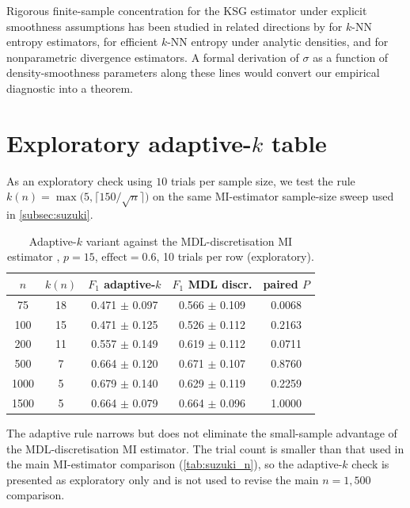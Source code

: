 Rigorous finite-sample concentration for the KSG estimator under
explicit smoothness assumptions has been studied in related
directions by \citet{singh2014exponential} for $k$-NN entropy
estimators, \citet{berrett2019efficient} for efficient $k$-NN
entropy under analytic densities, and \citet{han2020optimal} for
nonparametric divergence estimators. A formal derivation of $\sigma$
as a function of density-smoothness parameters along these lines
would convert our empirical diagnostic into a theorem.

\section{\texorpdfstring{Exploratory adaptive-$k$ table}{Exploratory adaptive-k table}}
\label{app:adaptive}

As an exploratory check using $10$ trials per sample size, we test
the rule $k(n) = \max\bigl(5, \lceil 150 / \sqrt{n}\rceil\bigr)$ on
the same MI-estimator sample-size sweep used in
\cref{subsec:suzuki}.

\begin{table}[ht]
\centering
\caption{Adaptive-$k$ variant against the MDL-discretisation MI
estimator \citep{suzuki2017chow}, $p = 15$, $\text{effect} = 0.6$,
10 trials per row (exploratory).}
\label{tab:adaptive}
\begin{tabular}{ccccc}
\toprule
$n$ & $k(n)$ & $F_1$ adaptive-$k$ & $F_1$ MDL discr. & paired $P$ \\
\midrule
75   & 18 & 0.471 $\pm$ 0.097 & 0.566 $\pm$ 0.109 & 0.0068 \\
100  & 15 & 0.471 $\pm$ 0.125 & 0.526 $\pm$ 0.112 & 0.2163 \\
200  & 11 & 0.557 $\pm$ 0.149 & 0.619 $\pm$ 0.112 & 0.0711 \\
500  & 7  & 0.664 $\pm$ 0.120 & 0.671 $\pm$ 0.107 & 0.8760 \\
1000 & 5  & 0.679 $\pm$ 0.140 & 0.629 $\pm$ 0.119 & 0.2259 \\
1500 & 5  & 0.664 $\pm$ 0.079 & 0.664 $\pm$ 0.096 & 1.0000 \\
\bottomrule
\end{tabular}
\end{table}

The adaptive rule narrows but does not eliminate the small-sample
advantage of the MDL-discretisation MI estimator. The trial count is
smaller than that used in the main MI-estimator comparison
(\cref{tab:suzuki_n}), so the adaptive-$k$ check is presented as
exploratory only and is not used to revise the main $n = 1{,}500$
comparison.

